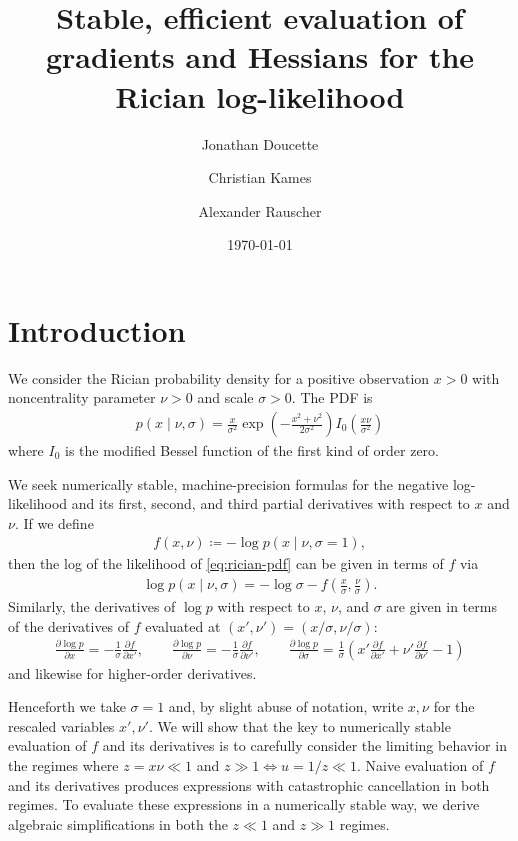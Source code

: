 \documentclass{article}
\title{Stable, efficient evaluation of gradients and Hessians for the Rician log-likelihood}
\author{
  Jonathan Doucette \and
  Christian Kames \and
  Alexander Rauscher
}
\date{\today}
\begin{document}
\maketitle

\section{Introduction}

We consider the Rician probability density for a positive observation $x>0$ with noncentrality parameter $\nu>0$ and scale $\sigma>0$.
The PDF is
%
\begin{align}
  p(x \mid \nu, \sigma) = \frac{x}{\sigma^2} \exp\left(-\frac{x^2+\nu^2}{2\sigma^2}\right) I_0\left(\frac{x\nu}{\sigma^2}\right) \label{eq:rician-pdf}
\end{align}
%
where $I_0$ is the modified Bessel function of the first kind of order zero.

We seek numerically stable, machine-precision formulas for the negative log-likelihood and its first, second, and third partial derivatives with respect to $x$ and $\nu$.
If we define
%
\begin{align}
  f(x, \nu) \coloneqq -\log p(x \mid \nu, \sigma = 1),
\end{align}
%
then the log of the likelihood of \cref{eq:rician-pdf} can be given in terms of $f$ via
%
\begin{align}
  \log p(x \mid \nu, \sigma) = -\log\sigma - f\left(\frac{x}{\sigma}, \frac{\nu}{\sigma}\right).
\end{align}
%
Similarly, the derivatives of $\log p$ with respect to $x$, $\nu$, and $\sigma$ are given in terms of the derivatives of $f$ evaluated at $(x', \nu') = (x / \sigma, \nu / \sigma)$:
%
\begin{align}
  \frac{\partial \log p}{\partial x}      = -\frac{1}{\sigma} \frac{\partial f}{\partial x'},                                                                                        \qquad
  \frac{\partial \log p}{\partial \nu}    = -\frac{1}{\sigma} \frac{\partial f}{\partial \nu'},                                                                                      \qquad
  \frac{\partial \log p}{\partial \sigma} = \frac{1}{\sigma} \left( x' \frac{\partial f}{\partial x'} + \nu' \frac{\partial f}{\partial \nu'} - 1 \right)
\end{align}
%
and likewise for higher-order derivatives.

Henceforth we take $\sigma=1$ and, by slight abuse of notation, write $x, \nu$ for the rescaled variables $x', \nu'$.
We will show that the key to numerically stable evaluation of $f$ and its derivatives is to carefully consider the limiting behavior in the regimes where $z = x\nu \ll 1$ and $z \gg 1 \Leftrightarrow u=1/z \ll 1$.
Naive evaluation of $f$ and its derivatives produces expressions with catastrophic cancellation in both regimes.
To evaluate these expressions in a numerically stable way, we derive algebraic simplifications in both the $z \ll 1$ and $z \gg 1$ regimes.
\end{document}
